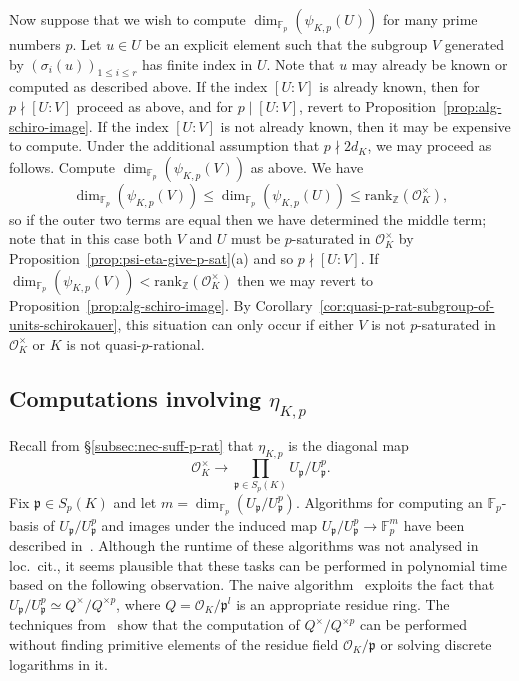 \documentclass[12pt, a4paper, usenames]{amsart}
\newcommand{\Z}{\mathbb{Z}}
\newcommand{\F}{\mathbb{F}}
\theoremstyle{plain}
\theoremstyle{remark}
\theoremstyle{definition}
\newcommand{\rank}{\mathrm{rank}}
\begin{document}
Now suppose that we wish to compute 
$\dim_{\mathbb{F}_{p}}(\psi_{K,p}(U))$ for many prime numbers $p$.
Let $u \in U$ be an explicit element such that 
the subgroup $V$ generated by $(\sigma_{i}(u))_{1 \leq i \leq r}$ has finite index in $U$.
Note that $u$ may already be known or computed as described above.
If the index $[U:V]$ is already known, then for 
$p \nmid [U:V]$ proceed as above, and for $p \mid [U:V]$, 
revert to Proposition~\ref{prop:alg-schiro-image}. 
If the index $[U:V]$ is not already known, then it may be expensive to compute.
Under the additional assumption that $p \nmid 2d_{K}$, we may proceed as follows.
Compute $\dim_{\F_{p}}(\psi_{K,p}(V))$ as above. 
We have 
\[
\dim_{\mathbb{F}_{p}}(\psi_{K,p}(V))
\leq
\dim_{\mathbb{F}_{p}}(\psi_{K,p}(U))
\leq 
\rank_{\Z}(\mathcal{O}_{K}^{\times}),
\]
so if the outer two terms are equal then we have determined the middle term;
note that in this case both $V$ and $U$ must be $p$-saturated in $\mathcal{O}_{K}^{\times}$
by Proposition~\ref{prop:psi-eta-give-p-sat}(a) and so $p \nmid [U:V]$.
If $\dim_{\F_{p}}(\psi_{K,p}(V)) < \rank_{\Z}(\mathcal{O}_{K}^{\times})$ then we may revert to 
Proposition~\ref{prop:alg-schiro-image}. 
By Corollary~\ref{cor:quasi-p-rat-subgroup-of-units-schirokauer}, this situation 
can only occur if either $V$ is not $p$-saturated in $\mathcal{O}_{K}^{\times}$ 
or $K$ is not quasi-$p$-rational.


\subsection{Computations involving $\eta_{K, p}$}\label{subsec:compute-eta}
Recall from \S \ref{subsec:nec-suff-p-rat} that $\eta_{K, p}$ is the diagonal map
\[ 
\textstyle{\mathcal{O}_{K}^{\times} 
\longrightarrow \prod_{\mathfrak{p} \in S_{p}(K)} 
U_{\mathfrak{p}}/U_{\mathfrak{p}}^{p}}. 
\]
Fix $\mathfrak{p} \in S_p(K)$ and let $m  = \dim_{\F_{p}} (U_{\mathfrak{p}}/U_{\mathfrak{p}}^{p})$.
Algorithms for computing an $\F_{p}$-basis of $U_{\mathfrak{p}}/U_{\mathfrak{p}}^p$ and images under the induced map $U_{\mathfrak{p}}/U_{\mathfrak{p}}^p \to \F_{p}^{m}$ have been described in~\cite{MR5022766}.
Although the runtime of these algorithms was not analysed in loc.\ cit., 
it seems plausible that these tasks can be 
performed in polynomial time based on the following observation.
The naive algorithm~\cite[Algorithm~1]{MR5022766} exploits the fact that $U_{\mathfrak{p}}/U_{\mathfrak{p}}^{p} \simeq Q^{\times}/Q^{\times p}$, where $Q = \mathcal{O}_{K}/\mathfrak{p}^{l}$ is an appropriate residue ring.
The techniques from~\cite[\S 3]{MR3952015} show that the computation of $Q^{\times}/Q^{\times p }$ can be performed without finding primitive elements of the residue field $\mathcal{O}_{K}/\mathfrak{p}$ or solving discrete logarithms in it.
\end{document}
